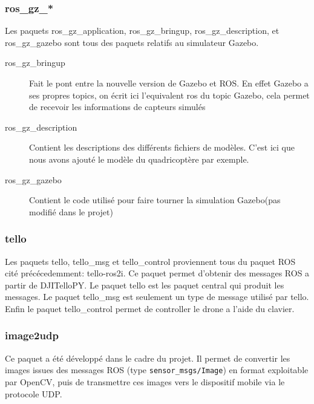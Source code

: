 \documentclass{article}
\begin{document}
\subsubsection{ros\_gz\_*}
Les paquets ros\_gz\_application, ros\_gz\_bringup, ros\_gz\_description, et
ros\_gz\_gazebo sont tous des paquets relatifs au simulateur Gazebo.
\begin{description}
    \item[ros\_gz\_bringup] Fait le pont entre la nouvelle version de Gazebo et ROS.
    En effet Gazebo a ses propres topics, on \'ecrit ici l'equivalent ros du topic Gazebo, cela permet de recevoir les informations de capteurs simul\'es
    \item[ros\_gz\_description] Contient les descriptions des diff\'erents fichiers de mod\`eles. C'est ici que nous avons ajout\'e le mod\`ele du quadricopt\`ere par exemple.
    \item[ros\_gz\_gazebo] Contient le code utilis\'e pour faire tourner la simulation Gazebo(pas modifi\'e dans le projet)
\end{description}

\subsubsection{tello}
Les paquets tello, tello\_msg et tello\_control proviennent tous du paquet ROS
cit\'e pr\'ec\'ecedemment: tello-ros2i\cite{telloros}. Ce paquet permet
d'obtenir des messages ROS a partir de DJITelloPY. 
Le paquet tello est les paquet central qui produit les messages.
Le paquet tello\_msg est seulement un type de message utilis\'e par tello.
Enfin le paquet tello\_control permet de controller le drone a l'aide du clavier.

\subsubsection{image2udp}
Ce paquet a été développé dans le cadre du projet. Il permet de convertir les
images issues des messages ROS (type \texttt{sensor\_msgs/Image}) en format
exploitable par OpenCV, puis de transmettre ces images vers le dispositif mobile
via le protocole UDP.
\end{document}
